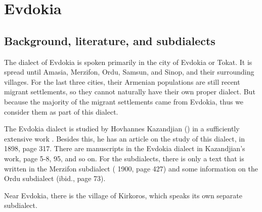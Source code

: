 \fussy

\chapter{Evdokia} \label{chapter:Evdokia}
\section{Background, literature, and subdialects}

\begin{adjarianpage}\label{page:232}\end{adjarianpage}%

The dialect of Evdokia is spoken primarily in the city of Evdokia or Tokat. It is spread until Amasia, Merzifon, Ordu, Samsun, and Sinop, and their surrounding villages. For the last three cities, their Armenian populations are still recent migrant settlements, so they cannot naturally have their own proper dialect. But because the majority of the migrant settlements came from Evdokia, thus we consider them as part of this dialect. 



The Evdokia dialect is studied by Hovhannes Kazandjian () in a sufficiently extensive work \citep{KazandjianBook}. Besides this, he has an article on the study of this dialect, in  1898, page 317. There are manuscripts in the Evdokia dialect in Kazandjian's work, page 5-8, 95, and so on. For the subdialects, there is only a text that is written in the Merzifon subdialect ( 1900, page 427) and some information on the Ordu subdialect (ibid., page 73). 

Near Evdokia, there is the village of Kirkoros, which speaks its own separate subdialect. 



